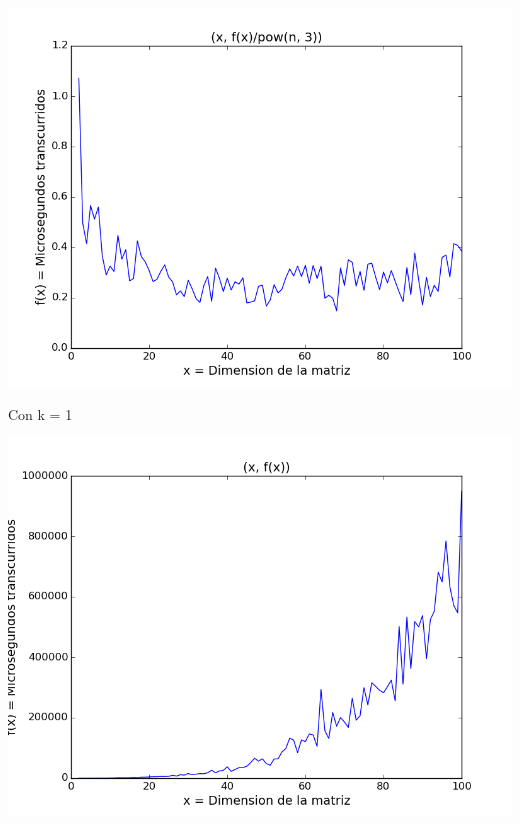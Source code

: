 \begin{center}
\includegraphics[scale=0.54]{images/0potenciasobrecubo}
\end{center}
\vspace{2mm}
\vspace{2mm}
\vspace{2mm}

Con k = 1

\begin{center}
\includegraphics[scale=0.54]{images/1potenciafuncion}
\end{center}


